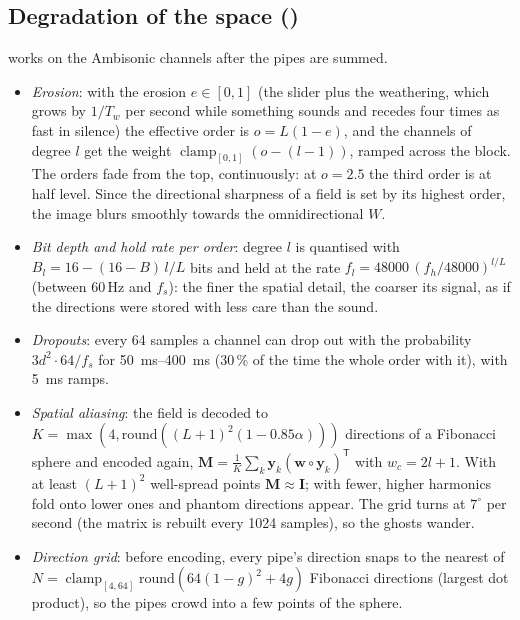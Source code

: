\subsection{Degradation of the space ()}
\label{sec:math-spacedeg}
 works on the Ambisonic channels after the pipes are summed.
\begin{itemize}[nosep]
  \item \emph{Erosion}: with the erosion $e\in[0,1]$ (the slider plus the weathering, which grows by $1/T_w$ per second while
    something sounds and recedes four times as fast in silence) the effective order is $o = L(1-e)$, and the channels of
    degree $l$ get the weight $\operatorname{clamp}_{[0,1]}(o - (l-1))$, ramped across the block. The orders fade from the
    top, continuously: at $o = 2.5$ the third order is at half level. Since the directional sharpness of a field is set
    by its highest order, the image blurs smoothly towards the omnidirectional $W$.
  \item \emph{Bit depth and hold rate per order}: degree $l$ is quantised with $B_l = 16 - (16-B)\,l/L$ bits and held at
    the rate $f_l = 48000\,(f_h/48000)^{l/L}$ (between 60\,Hz and $f_s$): the finer the spatial detail, the coarser its
    signal, as if the directions were stored with less care than the sound.
  \item \emph{Dropouts}: every 64 samples a channel can drop out with the probability $3d^2\cdot64/f_s$ for
    \SIrange{50}{400}{ms} (30\,\% of the time the whole order with it), with \SI{5}{ms} ramps.
  \item \emph{Spatial aliasing}: the field is decoded to $K = \max(4, \mathrm{round}((L+1)^2(1-0.85\alpha)))$ directions of a
    Fibonacci sphere and encoded again, $\mathbf M = \tfrac1K\sum_k \mathbf y_k(\mathbf w\circ\mathbf y_k)^{\mathsf T}$ with
    $w_c = 2l+1$. With at least $(L+1)^2$ well-spread points $\mathbf M\approx\mathbf I$; with fewer, higher harmonics fold
    onto lower ones and phantom directions appear. The grid turns at $7^\circ$ per second (the matrix is rebuilt every
    1024 samples), so the ghosts wander.
  \item \emph{Direction grid}: before encoding, every pipe's direction snaps to the nearest of
    $N = \operatorname{clamp}_{[4,64]}\mathrm{round}(64(1-g)^2 + 4g)$ Fibonacci directions (largest dot product), so the
    pipes crowd into a few points of the sphere.
\end{itemize}

